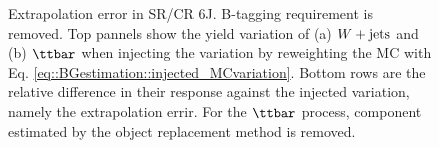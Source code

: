 \begin{figure}[h]
 \caption{Extrapolation error in SR/CR 6J. B-tagging requirement is removed. Top pannels show the yield variation of (a) $W+\mathrm{jets}$ and (b) $\ttbar$ when injecting the variation by reweighting the MC with Eq. \ref{eq::BGestimation::injected_MCvariation}. Bottom rows are the relative difference in their response against the injected variation, namely the extrapolation errir. For the $\ttbar$ process, component estimated by the object replacement method is removed.  \label{fig::BGestimation::valid_extp_6J} }
\end{figure}



